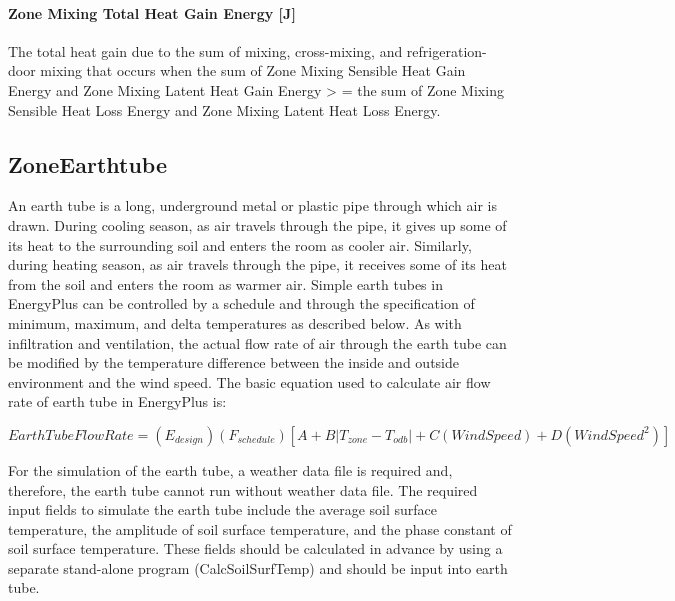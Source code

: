 \paragraph{Zone Mixing Total Heat Gain Energy {[}J{]}}\label{zone-mixing-total-heat-gain-energy-j-2}

The total heat gain due to the sum of mixing, cross-mixing, and refrigeration-door mixing that occurs when the sum of Zone Mixing Sensible Heat Gain Energy and Zone Mixing Latent Heat Gain Energy \textgreater{} = the sum of Zone Mixing Sensible Heat Loss Energy and Zone Mixing Latent Heat Loss Energy.

\subsection{ZoneEarthtube}\label{zoneearthtube-earth-tube}

An earth tube is a long, underground metal or plastic pipe through which air is drawn. During cooling season, as air travels through the pipe, it gives up some of its heat to the surrounding soil and enters the room as cooler air. Similarly, during heating season, as air travels through the pipe, it receives some of its heat from the soil and enters the room as warmer air. Simple earth tubes in EnergyPlus can be controlled by a schedule and through the specification of minimum, maximum, and delta temperatures as described below. As with infiltration and ventilation, the actual flow rate of air through the earth tube can be modified by the temperature difference between the inside and outside environment and the wind speed. The basic equation used to calculate air flow rate of earth tube in EnergyPlus is:

\begin{equation}
EarthTubeFlowRate = \left( {{E_{design}}} \right)\left( {{F_{schedule}}} \right)\left[ {A + B\left| {{T_{zone}} - {T_{odb}}} \right| + C\left( {WindSpeed} \right) + D\left( {WindSpee{d^2}} \right)} \right]
\end{equation}

For the simulation of the earth tube, a weather data file is required and, therefore, the earth tube cannot run without weather data file. The required input fields to simulate the earth tube include the average soil surface temperature, the amplitude of soil surface temperature, and the phase constant of soil surface temperature. These fields should be calculated in advance by using a separate stand-alone program (CalcSoilSurfTemp) and should be input into earth tube.

